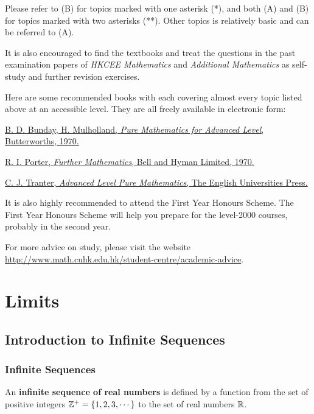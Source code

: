 \documentclass[a4paper,12pt]{article}
\begin{document}
Please refer to (B) for topics marked with one asterisk (*), and both (A) and (B) for topics marked with two asterisks (**). Other topics is relatively basic and can be referred to (A).\n

It is also encouraged to find the textbooks and treat the questions in the past examination papers of \textit{HKCEE Mathematics} and \textit{Additional Mathematics} as self-study and further revision exercises.\n

Here are some recommended books with each covering almost every topic listed above at an accessible level. They are all freely available in electronic form:
\begin{rlist}
  \item \href{https://archive.org/details/PureMathematicsForAdvancedLevel}{B. D. Bunday, H. Mulholland, \textit{Pure Mathematics for Advanced Level}, Butterworths, 1970.}
  \item \href{https://archive.org/details/FurtherMathematics}{R. I. Porter, \textit{Further Mathematics}, Bell and Hyman Limited, 1970.}
  \item \href{https://archive.org/details/in.ernet.dli.2015.285850}{C. J. Tranter, \textit{Advanced Level Pure Mathematics}, The English Universities Press.}
\end{rlist}

It is also highly recommended to attend the First Year Honours Scheme. The First Year Honours Scheme will help you prepare for the level-2000 courses, probably in the second year.\n

For more advice on study, please visit the website \url{http://www.math.cuhk.edu.hk/student-centre/academic-advice}.

\pagebreak

\fancyhead[R]{\nouppercase \lastrightmark}
\section{Limits}
\subsection{Introduction to Infinite Sequences}
\subsubsection{Infinite Sequences}
\begin{dft}
  An \textbf{infinite sequence of real numbers} is defined by a function from the set of positive integers $\mathbb{Z}^{+}=\left\{ 1,2,3,\cdots\right\}$ to the set of real numbers $\mathbb{R}$.
\end{dft}
\end{document}
